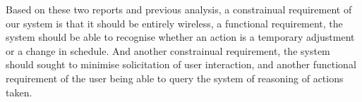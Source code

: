 Based on these two reports and previous analysis, a constrainual  requirement of our system is that it should be entirely wireless, a functional requirement, the system should be able to recognise whether an action is a temporary adjustment or a change in schedule. And another constrainual requirement, the system should sought to minimise solicitation of user interaction, and another functional requirement of the user being able to query the system of reasoning of actions taken.
\label{int:requirements}

